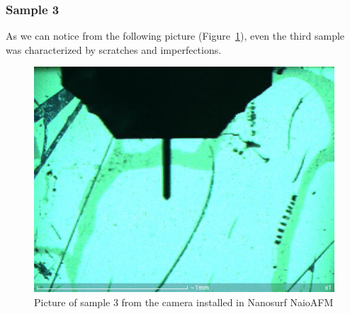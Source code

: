 \documentclass[11pt,a4paper]{article}
\begin{document}
\subsubsection{Sample 3}
As we can notice from the following picture (Figure~\ref{fig:sample3_set}), even the third sample was characterized by scratches and imperfections.
\begin{figure}[ht]
\begin{center}
\includegraphics[scale=0.4]{sm_sample3_set}
\caption{Picture of sample 3 from the camera installed in Nanosurf NaioAFM}\label{fig:sample3_set}
\end{center}
\end{figure}
\end{document}
